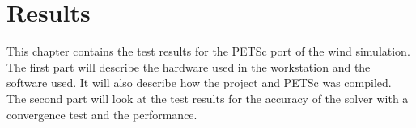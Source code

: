 \chapter{Results}

This chapter contains the test results for the PETSc port of the wind simulation. 
The first part will describe the hardware used in the workstation and the software 
used. It will also describe how the project and PETSc was compiled. The second part 
will look at the test results for the accuracy of the solver with a convergence 
test and the performance. 





